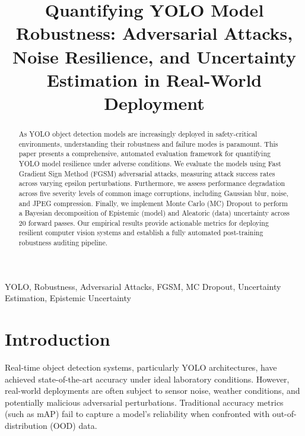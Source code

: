 \documentclass[conference]{IEEEtran}
\begin{document}
\title{Quantifying YOLO Model Robustness: Adversarial Attacks, Noise Resilience, and Uncertainty Estimation in Real-World Deployment}

\author{
}

\maketitle

\begin{abstract}
As YOLO object detection models are increasingly deployed in safety-critical environments, understanding their robustness and failure modes is paramount. This paper presents a comprehensive, automated evaluation framework for quantifying YOLO model resilience under adverse conditions. We evaluate the models using Fast Gradient Sign Method (FGSM) adversarial attacks, measuring attack success rates across varying epsilon perturbations. Furthermore, we assess performance degradation across five severity levels of common image corruptions, including Gaussian blur, noise, and JPEG compression. Finally, we implement Monte Carlo (MC) Dropout to perform a Bayesian decomposition of Epistemic (model) and Aleatoric (data) uncertainty across 20 forward passes. Our empirical results provide actionable metrics for deploying resilient computer vision systems and establish a fully automated post-training robustness auditing pipeline.
\end{abstract}

\begin{IEEEkeywords}
YOLO, Robustness, Adversarial Attacks, FGSM, MC Dropout, Uncertainty Estimation, Epistemic Uncertainty
\end{IEEEkeywords}

\section{Introduction}
Real-time object detection systems, particularly YOLO architectures, have achieved state-of-the-art accuracy under ideal laboratory conditions. However, real-world deployments are often subject to sensor noise, weather conditions, and potentially malicious adversarial perturbations. Traditional accuracy metrics (such as mAP) fail to capture a model's reliability when confronted with out-of-distribution (OOD) data.
\end{document}

